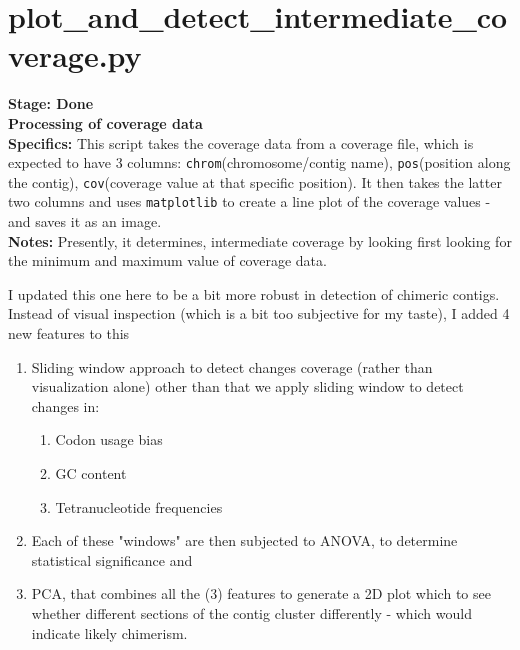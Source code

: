 \documentclass[11pt]{report}
\begin{document}
{\linenumbers*
\section{plot\_and\_detect\_intermediate\_coverage.py}
\textbf{Stage: Done} \\   
\textbf{Processing of coverage data} \\
\textbf{Specifics:} This script takes the coverage data from a coverage file, which is expected to have 3 columns: \texttt{chrom}(chromosome/contig name), \texttt{pos}(position along the contig), \texttt{cov}(coverage value at that specific position). It then takes the latter two columns and uses \texttt{matplotlib} to create a line plot of the coverage values - and saves it as an image.  \\
\textbf{Notes:} Presently, it determines, intermediate coverage by looking first looking for the minimum and maximum value of coverage data. \\
 
\begin{tcolorbox}[title=Sept 20 2024 Update, coltitle=white]
I updated this one here to be a bit more robust in detection of chimeric contigs. Instead of visual inspection (which is a bit too subjective for my taste), I added 4 new features to this 
	\begin{enumerate}
		\item Sliding window approach to detect changes coverage (rather than visualization alone) other than that we apply sliding window to detect changes in:
			\begin{enumerate}
				\item Codon usage bias
	 		\item GC content
				\item Tetranucleotide frequencies
			\end{enumerate}
	\item Each of these "windows" are then subjected to ANOVA, to determine statistical significance and 
	\item PCA, that combines all the (3) features to generate a 2D plot which to see whether different sections of the contig cluster differently - which would indicate likely chimerism. 
	\end{enumerate}
\end{tcolorbox} 

\linenumbers*
}
\end{document}
